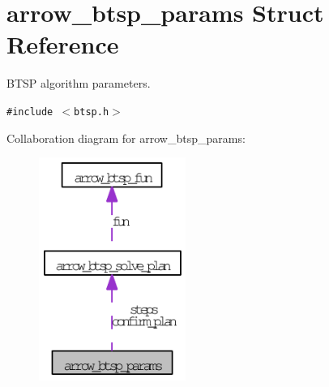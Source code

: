 \hypertarget{structarrow__btsp__params}{
\section{arrow\_\-btsp\_\-params Struct Reference}
\label{structarrow__btsp__params}
}
BTSP algorithm parameters.  


{\tt \#include $<$btsp.h$>$}

Collaboration diagram for arrow\_\-btsp\_\-params:\nopagebreak
\begin{figure}[H]
\begin{center}
\leavevmode
\includegraphics[width=136pt]{structarrow__btsp__params__coll__graph}
\end{center}
\end{figure}
